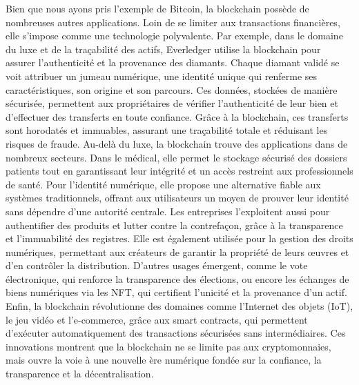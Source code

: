 Bien que nous ayons pris l’exemple de Bitcoin, la blockchain possède de nombreuses autres applications. Loin de se limiter aux transactions financières, elle s’impose comme une technologie polyvalente.
Par exemple, dans le domaine du luxe et de la traçabilité des actifs, Everledger utilise la blockchain pour assurer l’authenticité et la provenance des diamants. Chaque diamant validé se voit attribuer un jumeau numérique, une identité unique qui renferme ses caractéristiques, son origine et son parcours. Ces données, stockées de manière sécurisée, permettent aux propriétaires de vérifier l'authenticité de leur bien et d'effectuer des transferts en toute confiance. Grâce à la blockchain, ces transferts sont horodatés et immuables, assurant une traçabilité totale et réduisant les risques de fraude.
Au-delà du luxe, la blockchain trouve des applications dans de nombreux secteurs. Dans le médical, elle permet le stockage sécurisé des dossiers patients tout en garantissant leur intégrité et un accès restreint aux professionnels de santé. Pour l’identité numérique, elle propose une alternative fiable aux systèmes traditionnels, offrant aux utilisateurs un moyen de prouver leur identité sans dépendre d’une autorité centrale.
Les entreprises l’exploitent aussi pour authentifier des produits et lutter contre la contrefaçon, grâce à la transparence et l’immuabilité des registres. Elle est également utilisée pour la gestion des droits numériques, permettant aux créateurs de garantir la propriété de leurs œuvres et d’en contrôler la distribution.
D’autres usages émergent, comme le vote électronique, qui renforce la transparence des élections, ou encore les échanges de biens numériques via les NFT, qui certifient l’unicité et la provenance d’un actif. Enfin, la blockchain révolutionne des domaines comme l’Internet des objets (IoT), le jeu vidéo et l’e-commerce, grâce aux smart contracts, qui permettent d’exécuter automatiquement des transactions sécurisées sans intermédiaires.
Ces innovations montrent que la blockchain ne se limite pas aux cryptomonnaies, mais ouvre la voie à une nouvelle ère numérique fondée sur la confiance, la transparence et la décentralisation.


